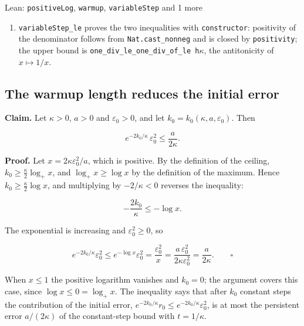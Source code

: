 \documentclass[11pt,a4paper]{report}
\begin{document}
\begin{leanbox}{Lean: \texttt{positiveLog}, \texttt{warmup}, \texttt{variableStep} and 1 more}
\begin{enumerate}
\item \texttt{variable\allowbreak{}Step\_\allowbreak{}le} proves the two inequalities with \texttt{constructor}: positivity of the denominator follows from \texttt{Nat.\allowbreak{}cast\_\allowbreak{}nonneg} and is closed by \texttt{positivity}; the upper bound is \texttt{one\_\allowbreak{}div\_\allowbreak{}le\_\allowbreak{}one\_\allowbreak{}div\_\allowbreak{}of\_\allowbreak{}le h\ensuremath{\kappa}}, the antitonicity of \(x\mapsto1/x\).

\end{enumerate}
\end{leanbox}
\subsection{\texorpdfstring{The warmup length reduces the initial error}{The warmup length reduces the initial error}}
\label{report-step-AverageLMC-Complexity-lean-2}


\textbf{Claim.} Let \(\kappa>0\), \(a>0\) and \(\varepsilon_0>0\), and let \(k_0=k_0(\kappa,a,\varepsilon_0)\). Then


\[e^{-2k_0/\kappa}\,\varepsilon_0^2\le\frac a{2\kappa}.\]


\textbf{Proof.} Let \(x=2\kappa\varepsilon_0^2/a\), which is positive. By the definition of the ceiling, \(k_0\ge\frac\kappa2\log_+x\), and \(\log_+x\ge\log x\) by the definition of the maximum. Hence \(k_0\ge\frac\kappa2\log x\), and multiplying by \(-2/\kappa<0\) reverses the inequality:


\[-\frac{2k_0}\kappa\le-\log x.\]


The exponential is increasing and \(\varepsilon_0^2\ge0\), so


\[e^{-2k_0/\kappa}\varepsilon_0^2\le e^{-\log x}\varepsilon_0^2=\frac{\varepsilon_0^2}{x}=\frac{a\,\varepsilon_0^2}{2\kappa\varepsilon_0^2}=\frac a{2\kappa}.\qquad\square\]


When \(x\le1\) the positive logarithm vanishes and \(k_0=0\); the argument covers this case, since \(\log x\le0=\log_+x\). The inequality says that after \(k_0\) constant steps the contribution of the initial error, \(e^{-2k_0/\kappa}r_0\le e^{-2k_0/\kappa}\varepsilon_0^2\), is at most the persistent error \(a/(2\kappa)\) of the constant-step bound with \(t=1/\kappa\).
\end{document}
